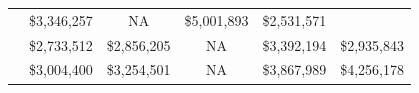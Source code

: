 \documentclass[]{book}
\theoremstyle{definition}
\theoremstyle{definition}
\theoremstyle{definition}
\theoremstyle{remark}
\begin{document}
\begin{longtable}[]{@{}cccccc@{}}
\begin{minipage}[t]{0.15\columnwidth}
\end{minipage} & \begin{minipage}[t]{0.15\columnwidth}\centering
\$3,346,257\strut
\end{minipage} & \begin{minipage}[t]{0.15\columnwidth}\centering
NA\strut
\end{minipage} & \begin{minipage}[t]{0.15\columnwidth}\centering
\$5,001,893\strut
\end{minipage} & \begin{minipage}[t]{0.15\columnwidth}\centering
\$2,531,571\strut
\end{minipage}\tabularnewline
\begin{minipage}[t]{0.10\columnwidth}\centering
2012\strut
\end{minipage} & \begin{minipage}[t]{0.15\columnwidth}\centering
\$2,733,512\strut
\end{minipage} & \begin{minipage}[t]{0.15\columnwidth}\centering
\$2,856,205\strut
\end{minipage} & \begin{minipage}[t]{0.15\columnwidth}\centering
NA\strut
\end{minipage} & \begin{minipage}[t]{0.15\columnwidth}\centering
\$3,392,194\strut
\end{minipage} & \begin{minipage}[t]{0.15\columnwidth}\centering
\$2,935,843\strut
\end{minipage}\tabularnewline
\begin{minipage}[t]{0.10\columnwidth}\centering
2013\strut
\end{minipage} & \begin{minipage}[t]{0.15\columnwidth}\centering
\$3,004,400\strut
\end{minipage} & \begin{minipage}[t]{0.15\columnwidth}\centering
\$3,254,501\strut
\end{minipage} & \begin{minipage}[t]{0.15\columnwidth}\centering
NA\strut
\end{minipage} & \begin{minipage}[t]{0.15\columnwidth}\centering
\$3,867,989\strut
\end{minipage} & \begin{minipage}[t]{0.15\columnwidth}\centering
\$4,256,178\strut
\end{minipage}\tabularnewline

\end{longtable}
\end{document}
